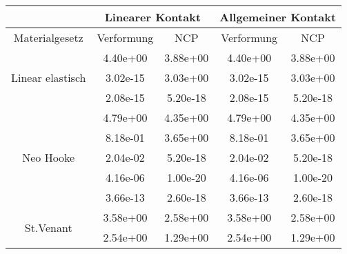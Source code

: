 \begin{table} 
\centering 
\begin{tabular}{c|cc|cc|} 
\cline{2-5} 
 & \multicolumn{2}{|c|}{Linearer Kontakt} & \multicolumn{2}{|c|}{Allgemeiner Kontakt} \\ 
\hline 
\multicolumn{1}{|c|}{Materialgesetz} & \multicolumn{1}{c|}{Verformung} & \multicolumn{1}{c|}{NCP} & \multicolumn{1}{c|}{Verformung} & \multicolumn{1}{c|}{NCP} \\ 
\hline 
\multicolumn{1}{|c|}{\multirow{3}{*}{Linear elastisch}} &\multicolumn{1}{|c|}{  4.40e+00} & \multicolumn{1}{|c|}{  3.88e+00} & \multicolumn{1}{|c|}{  4.40e+00} & \multicolumn{1}{|c|}{  3.88e+00} \\ 
\multicolumn{1}{|c|}{} & \multicolumn{1}{|c|}{  3.02e-15} & \multicolumn{1}{|c|}{  3.03e+00} & \multicolumn{1}{|c|}{  3.02e-15} & \multicolumn{1}{|c|}{  3.03e+00} \\ 
\multicolumn{1}{|c|}{} & \multicolumn{1}{|c|}{  2.08e-15} & \multicolumn{1}{|c|}{  5.20e-18} & \multicolumn{1}{|c|}{  2.08e-15} & \multicolumn{1}{|c|}{  5.20e-18} \\ 
\hline 
\multicolumn{1}{|c|}{\multirow{5}{*}{Neo Hooke}} &\multicolumn{1}{|c|}{  4.79e+00} & \multicolumn{1}{|c|}{  4.35e+00} & \multicolumn{1}{|c|}{  4.79e+00} & \multicolumn{1}{|c|}{  4.35e+00} \\ 
\multicolumn{1}{|c|}{} & \multicolumn{1}{|c|}{  8.18e-01} & \multicolumn{1}{|c|}{  3.65e+00} & \multicolumn{1}{|c|}{  8.18e-01} & \multicolumn{1}{|c|}{  3.65e+00} \\ 
\multicolumn{1}{|c|}{} & \multicolumn{1}{|c|}{  2.04e-02} & \multicolumn{1}{|c|}{  5.20e-18} & \multicolumn{1}{|c|}{  2.04e-02} & \multicolumn{1}{|c|}{  5.20e-18} \\ 
\multicolumn{1}{|c|}{} & \multicolumn{1}{|c|}{  4.16e-06} & \multicolumn{1}{|c|}{  1.00e-20} & \multicolumn{1}{|c|}{  4.16e-06} & \multicolumn{1}{|c|}{  1.00e-20} \\ 
\multicolumn{1}{|c|}{} & \multicolumn{1}{|c|}{  3.66e-13} & \multicolumn{1}{|c|}{  2.60e-18} & \multicolumn{1}{|c|}{  3.66e-13} & \multicolumn{1}{|c|}{  2.60e-18} \\ 
\hline 
\multicolumn{1}{|c|}{\multirow{7}{*}{St.Venant}} &\multicolumn{1}{|c|}{  3.58e+00} & \multicolumn{1}{|c|}{  2.58e+00} & \multicolumn{1}{|c|}{  3.58e+00} & \multicolumn{1}{|c|}{  2.58e+00} \\ 
\multicolumn{1}{|c|}{} & \multicolumn{1}{|c|}{  2.54e+00} & \multicolumn{1}{|c|}{  1.29e+00} & \multicolumn{1}{|c|}{  2.54e+00} & \multicolumn{1}{|c|}{  1.29e+00} \\ 

\end{tabular}
\end{table}
